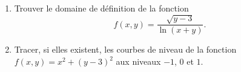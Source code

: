 \begin{exercice}\label{exoGeomAnal-0028}

  \begin{enumerate}
  \item Trouver le domaine de définition de la fonction 
    \begin{equation}
      f(x,y)=\frac{\sqrt{y-3}}{\ln (x+y)}.
    \end{equation}
  \item Tracer, si elles existent, les courbes de niveau de la fonction $\displaystyle f(x,y)= x^2+ (y-3)^2$ aux niveaux $-1$, $0$ et $1$.  
  \end{enumerate} 

\end{exercice}
